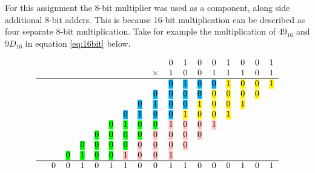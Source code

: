 \documentclass[11pt]{article}
\newcommand{\hlc}[2][yellow]{{%
    \colorlet{foo}{#1}%
    \sethlcolor{foo}\hl{#2}}%
}
\begin{document}
For this assignment the 8-bit multiplier was used as a component, along side additional 8-bit adders. 
This is because 16-bit multiplication can be described as four separate 8-bit multiplication.
Take for example the multiplication of $49_16$ and $9D_16$ in equation \ref{eq:16bit} below.

\begin{equation}
    \label{eq:16bit}
    \begin{tabular}{c c c c c c c c c c c c c c c c c c}
        &   &   &   &   &  &  &  &   & 0 & 1 & 0 & 0 & 1 & 0 & 0 & 1\\
        &   &   &   & &&&&$\times$   & 1 & 0 & 0 & 1 & 1 & 1 & 0 & 1 \\
                \hline
        &   &   &   &   &   &   &   &   & \hlc[cyan]{0} & \hlc[cyan]{1} & \hlc[cyan]{0} & \hlc[cyan]{0} & \hlc[yellow]{1} & \hlc[yellow]{0} & \hlc[yellow]{0} & \hlc[yellow]{1} \\
        &   &   &   &   &   &   &   & \hlc[cyan]{0} & \hlc[cyan]{0} & \hlc[cyan]{0} & \hlc[cyan]{0} & \hlc[yellow]{0} & \hlc[yellow]{0} & \hlc[yellow]{0} & \hlc[yellow]{0} &   \\
        &   &   &   &   &   &   & \hlc[cyan]{0} & \hlc[cyan]{1} & \hlc[cyan]{0} & \hlc[cyan]{0} & \hlc[yellow]{1} & \hlc[yellow]{0} & \hlc[yellow]{0} & \hlc[yellow]{1} &   &   \\
        &   &   &   &   &   & \hlc[cyan]{0} & \hlc[cyan]{1} & \hlc[cyan]{0} & \hlc[cyan]{0} & \hlc[yellow]{1} & \hlc[yellow]{0} & \hlc[yellow]{0} & \hlc[yellow]{1} &   &   &   \\
        &   &   &   &   & \hlc[green]{0} & \hlc[green]{1} & \hlc[green]{0} & \hlc[green]{0} & \hlc[pink]{1} & \hlc[pink]{0} & \hlc[pink]{0} & \hlc[pink]{1} &   &   &   &   \\
        &   &   &   & \hlc[green]{0} & \hlc[green]{0} & \hlc[green]{0} & \hlc[green]{0} & \hlc[pink]{0} & \hlc[pink]{0} & \hlc[pink]{0} & \hlc[pink]{0} &   &   &   &   &   \\
        &   &   & \hlc[green]{0} & \hlc[green]{0} & \hlc[green]{0} & \hlc[green]{0} & \hlc[pink]{0} & \hlc[pink]{0} & \hlc[pink]{0} & \hlc[pink]{0} &   &   &   &   &   &   \\
        &   & \hlc[green]{0} & \hlc[green]{1} & \hlc[green]{0} & \hlc[green]{0} & \hlc[pink]{1} & \hlc[pink]{0} & \hlc[pink]{0} & \hlc[pink]{1} &   &   &   &   &   &   &   \\
                \hline
        & 0 & 0 & 1 & 0 & 1 & 1 & 0 & 0 & 1 & 1 & 0 & 0 & 0 & 1 & 0 & 1 \\
    \end{tabular} 
\end{equation}
\end{document}
